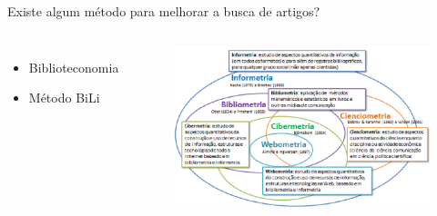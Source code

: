 \begin{frame}{Existe algum método para melhorar a busca de artigos?}

	\begin{columns}
		\begin{itemize}
			\item Biblioteconomia
			\item Método BiLi
		\end{itemize}
		\begin{figure}[hb]
			\includegraphics[width=1\textwidth]{figures/biblioeconomia.png}
		\end{figure}
	\end{columns}
\end{frame}

